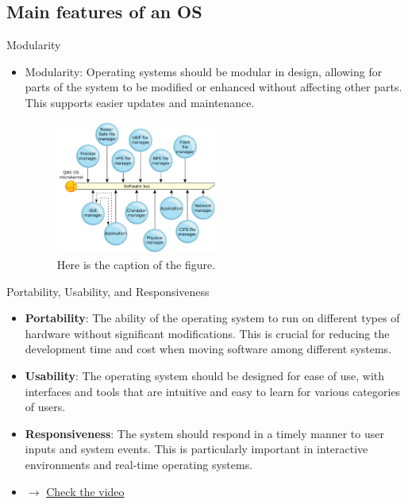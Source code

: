 \documentclass[10pt]{beamer}
\begin{document}
\subsection{Main features of an OS}
    \begin{frame}{Modularity}
      \begin{itemize}
        \item Modularity: Operating systems should be modular in design, allowing for parts of the system to be modified or enhanced without affecting other parts. This supports easier updates and maintenance.
        \begin{figure}[h]
          \centering
          \includegraphics[width=0.5\textwidth]{figures/qnxOSExample.png}
          \caption{Here is the caption of the figure.}
          \label{fig:my_label}
          \end{figure}
      \end{itemize}
    \end{frame}
    \begin{frame}{Portability, Usability, and Responsiveness}
      \begin{itemize}
      \item \textbf{Portability}: The ability of the operating system to run on different types of hardware without significant modifications. This is crucial for reducing the development time and cost when moving software among different systems.
      \item \textbf{Usability}: The operating system should be designed for ease of use, with interfaces and tools that are intuitive and easy to learn for various categories of users.
      \item \textbf{Responsiveness}: The system should respond in a timely manner to user inputs and system events. This is particularly important in interactive environments and real-time operating systems.
      \item $\rightarrow$ \href{https://www.youtube.com/watch?v=R_FoFbAyVQk\#t=10s}{Check the video}
    \end{itemize}
    \end{frame}
\end{document}
